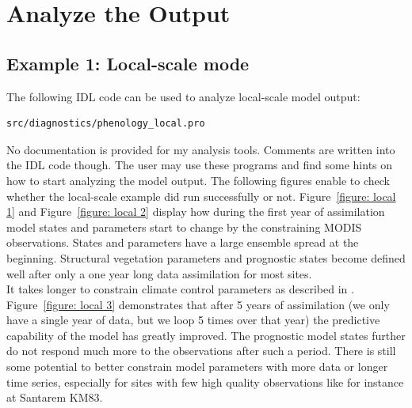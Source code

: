 \documentclass[a4paper,12pt]{article}
\begin{document}
\section{Analyze the Output}

\subsection{Example 1: Local-scale mode}
The following IDL code can be used to analyze local-scale model output:
\begin{verbatim}
src/diagnostics/phenology_local.pro
\end{verbatim}
No documentation is provided for my analysis tools. Comments are written into the IDL code though. The user may use these programs and find some hints on how to start analyzing the model output. The following figures enable to check whether the local-scale example did run successfully or not. Figure~\ref{figure: local 1} and Figure~\ref{figure: local 2} display how during the first year of assimilation model states and parameters start to change by the constraining MODIS observations. States and parameters have a large ensemble spread at the beginning. Structural vegetation parameters and prognostic states become defined well after only a one year long data assimilation for most sites.\\ 

It takes longer to constrain climate control parameters as described in \cite{Stockli2008}. Figure~\ref{figure: local 3} demonstrates that after 5 years of assimilation (we only have a single year of data, but we loop 5 times over that year) the predictive capability of the model has greatly improved. The prognostic model states further do not respond much more to the observations after such a period. There is still some potential to better constrain model parameters with more data or longer time series, especially for sites with few high quality observations like for instance at Santarem KM83.
\end{document}
